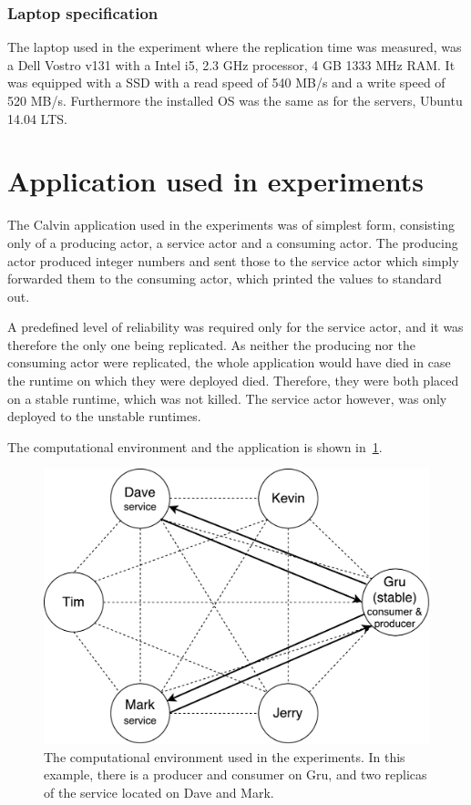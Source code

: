 \documentclass{cslthse-msc}
\begin{document}
\subsubsection{Laptop specification} \label{sec:laptop_spec}
The laptop used in the experiment where the replication time was measured, was a Dell Vostro v131 with a Intel i5, 2.3 GHz processor, 4 GB 1333 MHz RAM. It was equipped with a SSD with a read speed of 540 MB/s and a write speed of 520 MB/s. Furthermore the installed OS was the same as for the servers, Ubuntu 14.04 LTS.

\section{Application used in experiments} \label{sec:eval_application}
The Calvin application used in the experiments was of simplest form, consisting only of a producing actor, a service actor and a consuming actor. The producing actor produced integer numbers and sent those to the service actor which simply forwarded them to the consuming actor, which printed the values to standard out. 

A predefined level of reliability was required only for the service actor, and it was therefore the only one being replicated. As neither the producing nor the consuming actor were replicated, the whole application would have died in case the runtime on which they were deployed died. Therefore, they were both placed on a stable runtime, which was not killed. The service actor however, was only deployed to the unstable runtimes.

The computational environment and the application is shown in~\cref{fig:evaluation_application}.

\begin{figure}[!hbt]
\centering
\includegraphics[scale=0.5]{images/evaluation_application.pdf} 
\caption{The computational environment used in the experiments. In this example, there is a producer and consumer on Gru, and two replicas of the service located on Dave and Mark.} \label{fig:evaluation_application}
\end{figure}
\end{document}
